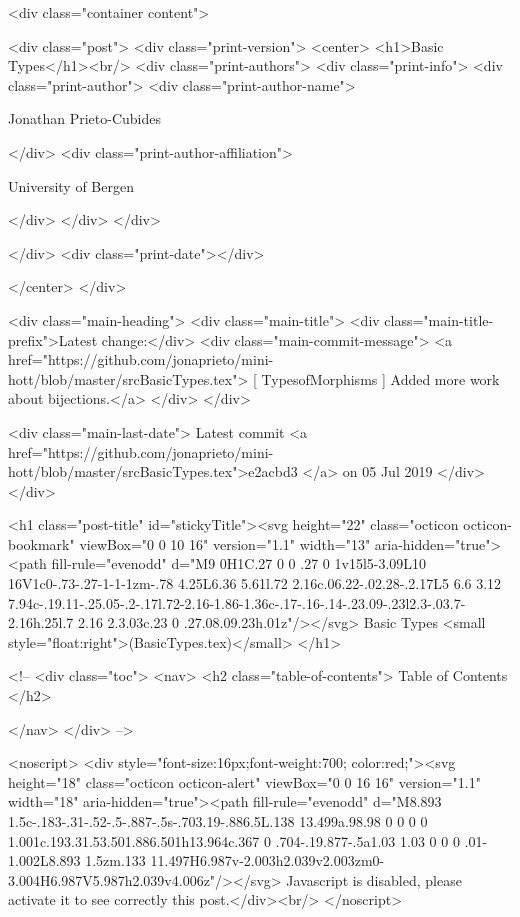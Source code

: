       <div class="container content">
        







<div class="post">
  <div class="print-version">
    <center>
      <h1>Basic Types</h1><br/>
        <div class="print-authors">
          <div class="print-info">
            <div class="print-author">
              <div class="print-author-name">
                
                  Jonathan Prieto-Cubides
                
              </div>
              <div class="print-author-affiliation">
                
                  University of Bergen
                
                </div>
            </div>
          </div>
          
          
        </div>
        <div class="print-date"></div>
        
        
    </center>
  </div>

  
  <div class="main-heading">
    <div class="main-title">
      <div class="main-title-prefix">Latest change:</div>
      <div class="main-commit-message">
            <a href="https://github.com/jonaprieto/mini-hott/blob/master/srcBasicTypes.tex">
              [ TypesofMorphisms ] Added more work about bijections.</a>
      </div>
    </div>

    <div class="main-last-date">
      Latest commit <a href="https://github.com/jonaprieto/mini-hott/blob/master/srcBasicTypes.tex">e2acbd3 </a> on  05 Jul 2019
    </div>
  </div>
  

  <h1 class="post-title" id="stickyTitle"><svg height="22" class="octicon octicon-bookmark" viewBox="0 0 10 16" version="1.1" width="13" aria-hidden="true"><path fill-rule="evenodd" d="M9 0H1C.27 0 0 .27 0 1v15l5-3.09L10 16V1c0-.73-.27-1-1-1zm-.78 4.25L6.36 5.61l.72 2.16c.06.22-.02.28-.2.17L5 6.6 3.12 7.94c-.19.11-.25.05-.2-.17l.72-2.16-1.86-1.36c-.17-.16-.14-.23.09-.23l2.3-.03.7-2.16h.25l.7 2.16 2.3.03c.23 0 .27.08.09.23h.01z"/></svg> Basic Types <small style="float:right">(BasicTypes.tex)</small>
  </h1>

  <!-- 
  <div class="toc">
    <nav>
    <h2 class="table-of-contents"> Table of Contents </h2>
      

    </nav>
  </div>
   -->

  <noscript>
  <div style="font-size:16px;font-weight:700; color:red;"><svg height="18" class="octicon octicon-alert" viewBox="0 0 16 16" version="1.1" width="18" aria-hidden="true"><path fill-rule="evenodd" d="M8.893 1.5c-.183-.31-.52-.5-.887-.5s-.703.19-.886.5L.138 13.499a.98.98 0 0 0 0 1.001c.193.31.53.501.886.501h13.964c.367 0 .704-.19.877-.5a1.03 1.03 0 0 0 .01-1.002L8.893 1.5zm.133 11.497H6.987v-2.003h2.039v2.003zm0-3.004H6.987V5.987h2.039v4.006z"/></svg> Javascript is disabled, please activate it to see correctly this post.</div><br/>
  </noscript>

